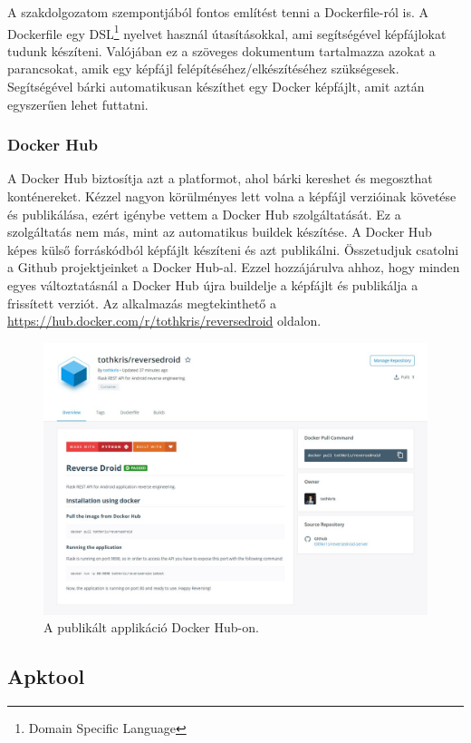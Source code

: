 \documentclass{thesis-ekf}
\theoremstyle{definition}
\theoremstyle{remark}
\begin{document}
A szakdolgozatom szempontjából fontos említést tenni a Dockerfile-ról is.
A Dockerfile egy DSL\footnote{Domain Specific Language} nyelvet használ útasításokkal, ami segítségével képfájlokat tudunk készíteni.
Valójában ez a szöveges dokumentum tartalmazza azokat a parancsokat, amik egy képfájl felépítéséhez/elkészítéséhez szükségesek.
Segítségével bárki automatikusan készíthet egy Docker képfájlt, amit aztán egyszerűen lehet futtatni.

\subsubsection{Docker Hub}

A Docker Hub biztosítja azt a platformot, ahol bárki kereshet és megoszthat konténereket.
Kézzel nagyon körülményes lett volna a képfájl verzióinak követése és publikálása, ezért igénybe vettem a Docker Hub szolgáltatását.
Ez a szolgáltatás nem más, mint az automatikus buildek készítése.
A Docker Hub képes külső forráskódból képfájlt készíteni és azt publikálni.
Összetudjuk csatolni a Github projektjeinket a Docker Hub-al. 
Ezzel hozzájárulva ahhoz, hogy minden egyes változtatásnál a Docker Hub újra buildelje a képfájlt és publikálja a frissített verziót.
Az alkalmazás megtekinthető a \url{https://hub.docker.com/r/tothkris/reversedroid} oldalon.

\begin{figure}[!h]
	\centering
	\includegraphics[width=15cm]{pictures/docker_hub}
	\caption{A publikált applikáció Docker Hub-on.}
	\label{dockerhub}
\end{figure}

\subsection{Apktool}
\end{document}
